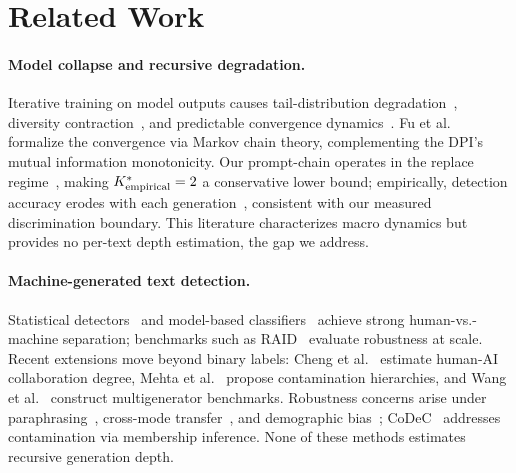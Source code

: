 \section{Related Work}
\label{sec:related_work}

\paragraph{Model collapse and recursive degradation.}
Iterative training on model outputs causes tail-distribution degradation~\cite{shumailov2024collapse, alemohammad2024selfconsuming, dohmatob2024model, dohmatob2025strong}, diversity contraction~\cite{guo2024curious, padmakumar2024writing, briesch2023selfconsuming}, and predictable convergence dynamics~\cite{schaeffer2025position, kazdan2025collapse, gerstgrasser2024model, wang2025unveiling}.
Fu et al.~\cite{fu2025theoretical} formalize the convergence via Markov chain theory, complementing the DPI's mutual information monotonicity.
Our prompt-chain operates in the replace regime~\cite{kazdan2025collapse}, making ${K^*_{\text{empirical}}} = 2$ a conservative lower bound; empirically, detection accuracy erodes with each generation~\cite{hao2025rewrite}, consistent with our measured discrimination boundary.
This literature characterizes macro dynamics but provides no per-text depth estimation, the gap we address.

\paragraph{Machine-generated text detection.}
Statistical detectors~\cite{mitchell2023detectgpt, bao2024fast} and model-based classifiers~\cite{hans2024binoculars, basani2026diveye, zhang2024minkpp, verma2024ghostbuster} achieve strong human-vs.-machine separation; benchmarks such as RAID~\cite{dugan2024raid} evaluate robustness at scale.
Recent extensions move beyond binary labels: Cheng et al.~\cite{cheng2025beyond} estimate human-AI collaboration degree, Mehta et al.~\cite{mehta2025beyond} propose contamination hierarchies, and Wang et al.~\cite{wang2024semeval} construct multigenerator benchmarks.
Robustness concerns arise under paraphrasing~\cite{sadasivan2023detect, krishna2023paraphrasing}, cross-mode transfer~\cite{hao2025rewrite}, and demographic bias~\cite{liang2023gpt}; CoDeC~\cite{zawalski2026codec} addresses contamination via membership inference.
None of these methods estimates recursive generation depth.

